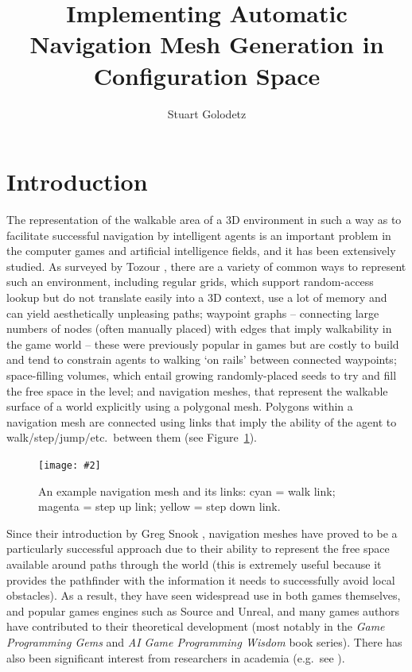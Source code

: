 \documentclass[10pt,twocolumn]{article}
\newcommand{\stufigex}[5]					%
{
	\begin{figure}[#5]
	\begin{center}
		\texttt{[image: \#2]}
		\caption{#3}
		\label{#4}
	\end{center}
	\end{figure}
}
\begin{document}
\title{Implementing Automatic Navigation Mesh Generation in Configuration Space}
\author{Stuart Golodetz}
\date{}
\maketitle

\section{Introduction}

The representation of the walkable area of a 3D environment in such a way as to facilitate successful navigation by intelligent agents is an important problem in the computer games and artificial intelligence fields, and it has been extensively studied. As surveyed by Tozour \cite{tozour04}, there are a variety of common ways to represent such an environment, including regular grids, which support random-access lookup but do not translate easily into a 3D context, use a lot of memory and can yield aesthetically unpleasing paths; waypoint graphs -- connecting large numbers of nodes (often manually placed) with edges that imply walkability in the game world -- these were previously popular in games but are costly to build and tend to constrain agents to walking `on rails' between connected waypoints; space-filling volumes, which entail growing randomly-placed seeds to try and fill the free space in the level; and navigation meshes, that represent the walkable surface of a world explicitly using a polygonal mesh. Polygons within a navigation mesh are connected using links that imply the ability of the agent to walk/step/jump/etc.\ between them (see Figure~\ref{fig:1}).

\stufigex{width=.9\linewidth}{blakeney-upperramp-clearer.png}{An example navigation mesh and its links: cyan = walk link; magenta = step up link; yellow = step down link.}{fig:1}{t}

Since their introduction by Greg Snook \cite{snook00}, navigation meshes have proved to be a particularly successful approach due to their ability to represent the free space available around paths through the world (this is extremely useful because it provides the pathfinder with the information it needs to successfully avoid local obstacles). As a result, they have seen widespread use in both games themselves, and popular games engines such as Source and Unreal, and many games authors have contributed to their theoretical development (most notably in the \emph{Game Programming Gems} and \emph{AI Game Programming Wisdom} book series). There has also been significant interest from researchers in academia (e.g.~see \cite{hale09,kallmann10,pettre05,vantoll11}).
\end{document}
